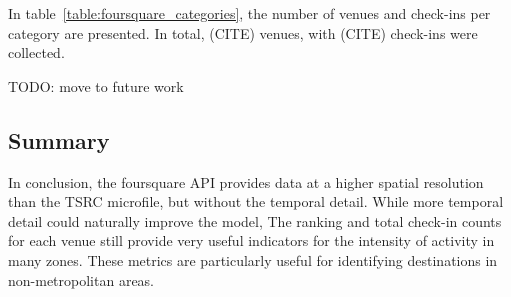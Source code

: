 In table~\ref{table:foursquare_categories}, the number of venues and check-ins per category are presented. In total, (CITE) venues, with (CITE) check-ins were collected.



TODO: move to future work
\subsection{Summary}
In conclusion, the foursquare API provides data at a higher spatial resolution than the TSRC microfile, but without the temporal detail. While more temporal detail could naturally improve the model, The ranking and total check-in counts for each venue still provide very useful indicators for the intensity of activity in many zones. These metrics are particularly useful for identifying destinations in non-metropolitan areas.